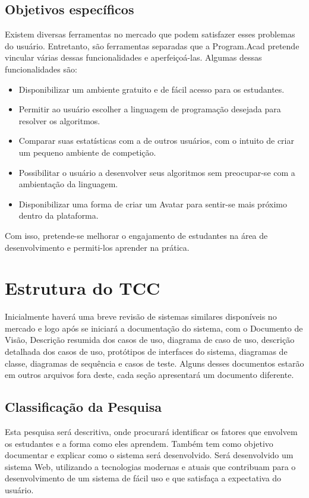 \subsection{Objetivos específicos}
\label{subsec:objetivo-especificos}
Existem diversas ferramentas no mercado que podem satisfazer esses problemas do usuário. Entretanto, são ferramentas separadas que a Program.Acad pretende vincular várias dessas funcionalidades e aperfeiçoá-las. Algumas dessas funcionalidades são:
\begin{itemize}
	\item Disponibilizar um ambiente gratuito e de fácil acesso para os estudantes.
	\item Permitir ao usuário escolher a linguagem de programação desejada para resolver os algoritmos.
	\item Comparar suas estatísticas com a de outros usuários, com o intuito de criar um pequeno ambiente de competição.
	\item Possibilitar o usuário a desenvolver seus algoritmos sem preocupar-se com a ambientação da linguagem.
	\item Disponibilizar uma forma de criar um Avatar para sentir-se mais próximo dentro da plataforma.
\end{itemize}

Com isso, pretende-se melhorar o engajamento de estudantes na área de desenvolvimento e permiti-los aprender na prática.

\section{Estrutura do TCC}
\label{sec:estruturacao}
Inicialmente haverá uma breve revisão de sistemas similares disponíveis no mercado e logo após se iniciará a documentação do sistema, com o Documento de Visão, Descrição resumida dos casos de uso, diagrama de caso de uso, descrição detalhada dos casos de uso, protótipos de interfaces do sistema, diagramas de classe, diagramas de sequência e casos de teste.
Alguns desses documentos estarão em outros arquivos fora deste, cada seção apresentará um documento diferente.

\subsection{Classificação da Pesquisa}
\label{subsec:classificacao-pesquisa}
Esta pesquisa será descritiva, onde procurará identificar os fatores que envolvem os estudantes e a forma como eles aprendem. Também tem como objetivo documentar e explicar como o sistema será desenvolvido.
Será desenvolvido um sistema Web, utilizando a tecnologias modernas e atuais que contribuam para o desenvolvimento de um sistema de fácil uso e que satisfaça a expectativa do usuário.
